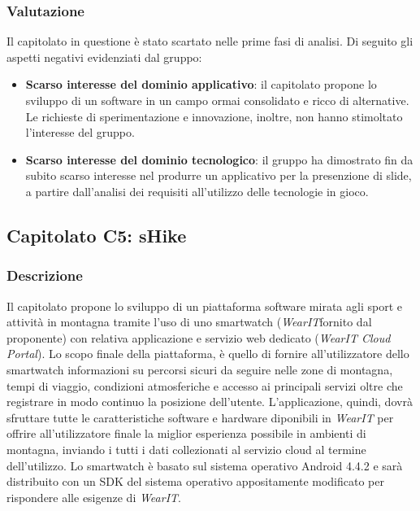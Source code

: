 \subsubsection{Valutazione}
Il capitolato in questione è stato scartato nelle prime fasi di analisi. Di seguito gli aspetti negativi evidenziati dal gruppo:
\begin{itemize}
\item \textbf{Scarso interesse del dominio applicativo}: il capitolato propone lo sviluppo di un software in un campo ormai consolidato e ricco di alternative. Le richieste di sperimentazione e innovazione, inoltre, non hanno stimoltato l'interesse del gruppo.
\item \textbf{Scarso interesse del dominio tecnologico}: il gruppo ha dimostrato fin da subito scarso interesse nel produrre un applicativo per la presenzione di slide, a partire dall'analisi dei requisiti all'utilizzo delle tecnologie in gioco.
\end{itemize}


\subsection{Capitolato C5: sHike}

\subsubsection{Descrizione}
Il capitolato propone lo sviluppo di un piattaforma software mirata agli sport e attività  in montagna tramite l'uso di uno smartwatch (\emph{WearIT}fornito dal proponente) con relativa applicazione e servizio web dedicato (\emph{WearIT Cloud Portal}). Lo scopo finale della piattaforma, è quello di fornire all'utilizzatore dello smartwatch informazioni su percorsi sicuri da seguire nelle zone di montagna, tempi di viaggio, condizioni atmosferiche e accesso ai principali servizi oltre che registrare in modo continuo la posizione dell'utente. L'applicazione, quindi, dovrà sfruttare tutte le caratteristiche software e hardware diponibili in \emph{WearIT} per offrire all'utilizzatore finale la miglior esperienza possibile in ambienti di montagna, inviando i tutti i dati collezionati al servizio cloud al termine dell'utilizzo.
Lo smartwatch è basato sul sistema operativo Android 4.4.2 e sarà distribuito con un SDK del sistema operativo appositamente modificato per rispondere alle esigenze di \emph{WearIT}.

